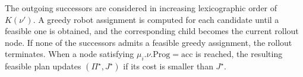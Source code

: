 \documentclass[lettersize,journal]{IEEEtran}
\theoremstyle{italiclemma}
\theoremstyle{italiclemma}
\theoremstyle{definition}
\begin{document}
The outgoing successors are considered in increasing lexicographic order of $K(\nu')$. A greedy robot assignment is computed for each candidate until a feasible one is obtained, and the corresponding child becomes the current rollout node. If none of the successors
admits a feasible greedy assignment, the rollout terminates. When a node satisfying $\mu_i.\nu.\mathrm{Prog}=\mathrm{acc}$ is reached, the resulting feasible plan updates $(\Pi^\star,J^\star)$ if its cost is smaller than $J^\star$. 



\end{document}
